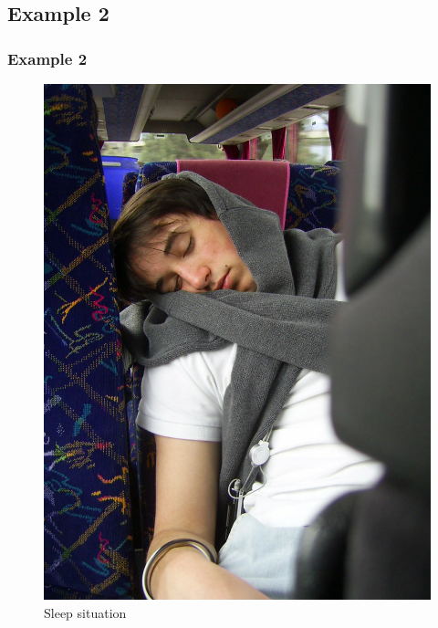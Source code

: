 \documentclass{beamer}
\begin{document}
\subsection{Example 2}
\begin{frame}\frametitle{Example 2}
\begin{figure}[h!]
   \begin{center}
   \includegraphics[scale=0.16]{sleep.png}
   \end{center}
   \caption{Sleep situation} 
   \end{figure}
    
\end{frame}
\end{document}
